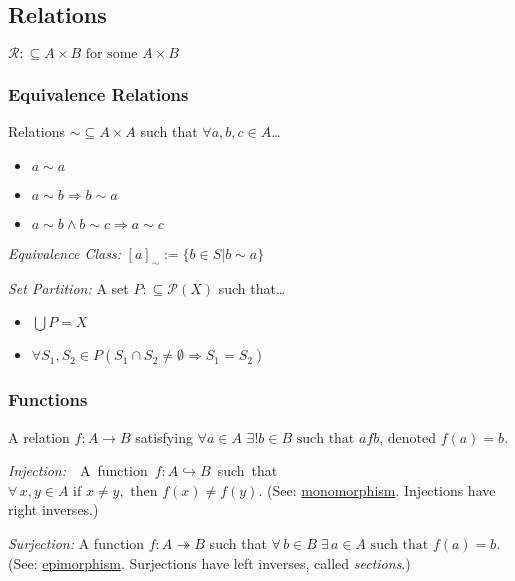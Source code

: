 \subsection{Relations}\label{relations}
$\mathcal{R} :\subseteq A \times B \textrm{ for some } A \times B$

\subsubsection{Equivalence Relations}\label{equivalencerelation}
Relations $\sim \subseteq A \times A$ such that $\forall a,b,c \in A$\dots
\begin{itemize}
  \item $a \sim a$
  \item $a \sim b \Rightarrow b \sim a$
  \item $a \sim b \land b \sim c \Rightarrow a \sim c$
\end{itemize}

\noindent \emph{Equivalence Class:} $[a]_{\sim} := \{ b \in S | b \sim a \}$ \newline

\noindent \emph{Set Partition:} A set $P :\subseteq \mathcal{P}(X)$ such that\dots
\begin{itemize}
  \item $\bigcup P = X$
  \item $\forall S_1, S_2 \in P (S_1 \cap S_2 \neq \emptyset \Rightarrow S_1 = S_2)$
\end{itemize}

\subsubsection{Functions}\label{function}
A relation $f: A \rightarrow B$ satisfying $\forall a \in A$ \mbox{$\exists! b \in B \textrm{ such that } afb \textrm{, denoted } f(a) = b$.} \newline

\noindent \mbox{\emph{Injection:} \label{injection} A function $\ensuremath{f: A \hookrightarrow B}$ such that $\forall \, x,y \in A \textrm{ if } x \neq y, \textrm{ then } f(x) \neq f(y)$.} (See: \hyperref[monomorphism]{monomorphism}. Injections have right inverses.) \newline

\noindent \emph{Surjection:} \label{surjection} A function $\ensuremath{f: A \twoheadrightarrow B}$ such that $\forall \, b \in B \; \exists \, a \in A \textrm{ such that } f(a) = b$. (See: \hyperref[epimorphism]{epimorphism}. Surjections have left inverses, called \emph{sections}.) \newline

